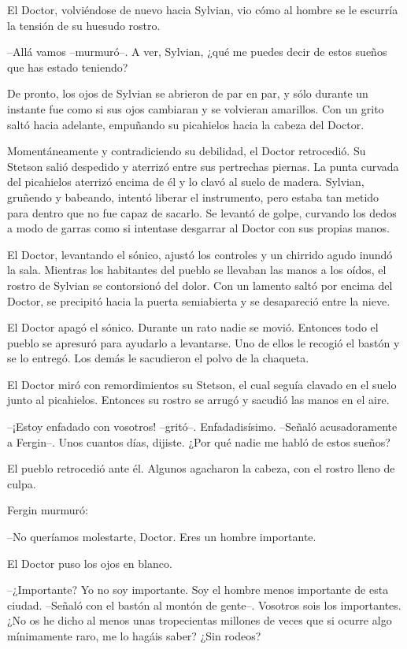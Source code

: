El Doctor, volviéndose de nuevo hacia Sylvian, vio cómo al hombre se le escurría la tensión de su huesudo rostro. 

--Allá vamos --murmuró--. A ver, Sylvian, ¿qué me puedes decir de estos sueños que has estado teniendo?

De pronto, los ojos de Sylvian se abrieron de par en par, y sólo durante un instante fue como si sus ojos cambiaran y se volvieran amarillos. Con un grito saltó hacia adelante, empuñando su picahielos hacia la cabeza del Doctor.

Momentáneamente y contradiciendo su debilidad, el Doctor retrocedió. Su Stetson salió despedido y aterrizó entre sus pertrechas piernas. La punta curvada del picahielos aterrizó encima de él y lo clavó al suelo de madera. Sylvian, gruñendo y babeando, intentó liberar el instrumento, pero estaba tan metido para dentro que no fue capaz de sacarlo. Se levantó de golpe, curvando los dedos a modo de garras como si intentase desgarrar al Doctor con sus propias manos.

El Doctor, levantando el sónico, ajustó los controles y un chirrido agudo inundó la sala. Mientras los habitantes del pueblo se llevaban las manos a los oídos, el rostro de Sylvian se contorsionó del dolor. Con un lamento saltó por encima del Doctor, se precipitó hacia la puerta semiabierta y se desapareció entre la nieve.

El Doctor apagó el sónico. Durante un rato nadie se movió. Entonces todo el pueblo se apresuró para ayudarlo a levantarse. Uno de ellos le recogió el bastón y se lo entregó. Los demás le sacudieron el polvo de la chaqueta.

El Doctor miró con remordimientos su Stetson, el cual seguía clavado en el suelo junto al picahielos. Entonces su rostro se arrugó y sacudió las manos en el aire.

--¡Estoy enfadado con vosotros! --gritó--. Enfadadisísimo. --Señaló acusadoramente a Fergin--. Unos cuantos días, dijiste. ¿Por qué nadie me habló de estos sueños?

El pueblo retrocedió ante él. Algunos agacharon la cabeza, con el rostro lleno de culpa.

Fergin murmuró:

--No queríamos molestarte, Doctor. Eres un hombre importante.

El Doctor puso los ojos en blanco.

--¿Importante? Yo no soy importante. Soy el hombre menos importante de esta ciudad. --Señaló con el bastón al montón de gente--. Vosotros sois los importantes. ¿No os he dicho al menos unas tropecientas millones de veces que si ocurre algo mínimamente raro, me lo hagáis saber? ¿Sin rodeos?

